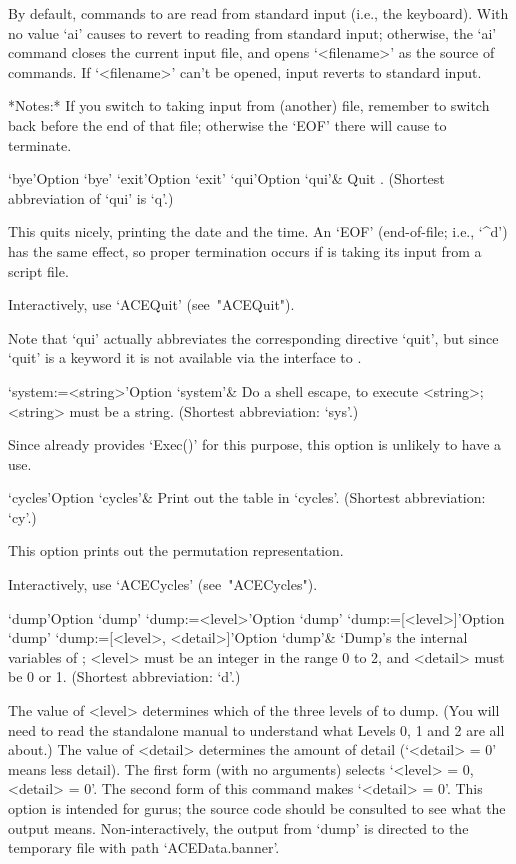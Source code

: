By default, commands to {\ACE} are read from standard input (i.e., the
keyboard). With no value `ai' causes {\ACE} to revert to reading  from
standard input; otherwise, the `ai' command closes the  current  input
file,  and  opens  `<filename>'  as  the  source   of   commands.   If
`<filename>' can't be opened, input reverts to standard input.

*Notes:*
If you switch to taking input from (another) file, remember to  switch
back before the end of that file; otherwise the `EOF' there will cause
{\ACE} to terminate.

\>`bye'{Option `bye'}
\>`exit'{Option `exit'}
\>`qui'{Option `qui'}&
Quit {\ACE}. (Shortest abbreviation of `qui' is `q'.)

This quits {\ACE} nicely, printing the date and  the  time.  An  `EOF'
(end-of-file;  i.e.,  `\^{}d')  has  the  same   effect,   so   proper
termination occurs if {\ACE} is taking its input from a script file.

Interactively, use `ACEQuit' (see~"ACEQuit").

Note  that  `qui'  actually  abbreviates  the   corresponding   {\ACE}
directive `quit', but since `quit' is  a  {\GAP}  keyword  it  is  not
available via the {\GAP} interface to {\ACE}.

\>`system:=<string>'{Option `system'}&
Do a shell escape, to execute <string>; <string> must be a string.
(Shortest abbreviation: `sys'.)

Since {\GAP} already provides `Exec()' for this purpose,  this  option
is unlikely to have a use.

\enditems


\beginitems

\>`cycles'{Option `cycles'}&
Print out the table in `cycles'. (Shortest abbreviation: `cy'.)

This option prints out the permutation representation.

Interactively, use `ACECycles' (see~"ACECycles").

\>`dump'{Option `dump'}
\>`dump:=<level>'{Option `dump'}
\>`dump:=[<level>]'{Option `dump'}
\>`dump:=[<level>, <detail>]'{Option `dump'}&
`Dump's the internal variables of {\ACE}; <level> must be  an  integer
in the range 0 to 2, and <detail> must be 0 or 1.
(Shortest abbreviation: `d'.)

The value of <level> determines which of the three levels of {\ACE} to
dump. (You will need to read the standalone manual to understand  what
Levels 0, 1 and 2 are all about.) The value of <detail> determines the
amount of detail (`<detail> = 0' means less detail).  The  first  form
(with no arguments) selects `<level> = 0, <detail> =  0'.  The  second
form of this command makes `<detail> = 0'. This option is intended for
gurus; the source code should be consulted  to  see  what  the  output
means. Non-interactively, the output from `dump' is  directed  to  the
temporary file with path `ACEData.banner'.

